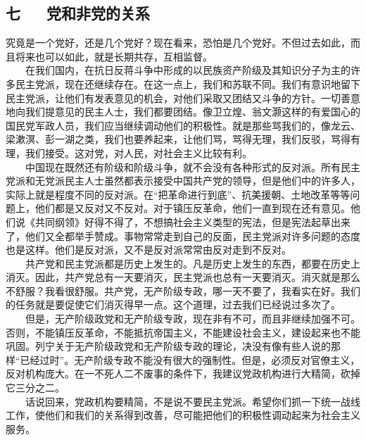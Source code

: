 \documentclass[cn,11pt,chinese]{elegantbook}
\def\myformat#1{\hfil\hfil #1}
\begin{document}
\subsection*{\myformat{七 　  党和非党的关系}}
究竟是一个党好，还是几个党好？现在看来，恐怕是几个党好。不但过去如此，而且将来也可以如此，就是长期共存，互相监督。\\
　　在我们国内，在抗日反蒋斗争中形成的以民族资产阶级及其知识分子为主的许多民主党派，现在还继续存在。在这一点上，我们和苏联不同。我们有意识地留下民主党派，让他们有发表意见的机会，对他们采取又团结又斗争的方针。一切善意地向我们提意见的民主人士，我们都要团结。像卫立煌、翁文灏这样的有爱国心的国民党军政人员，我们应当继续调动他们的积极性。就是那些骂我们的，像龙云、梁漱溟、彭一湖之类，我们也要养起来，让他们骂，骂得无理，我们反驳，骂得有理，我们接受。这对党，对人民，对社会主义比较有利。\\
　　中国现在既然还有阶级和阶级斗争，就不会没有各种形式的反对派。所有民主党派和无党派民主人士虽然都表示接受中国共产党的领导，但是他们中的许多人，实际上就是程度不同的反对派。在“把革命进行到底”、抗美援朝、土地改革等等问题上，他们都是又反对又不反对。对于镇压反革命，他们一直到现在还有意见。他们说《共同纲领》好得不得了，不想搞社会主义类型的宪法，但是宪法起草出来了，他们又全都举手赞成。事物常常走到自己的反面，民主党派对许多问题的态度也是这样。他们是反对派，又不是反对派常常由反对走到不反对。\\
　　共产党和民主党派都是历史上发生的。凡是历史上发生的东西，都要在历史上消灭。因此，共产党总有一天要消灭，民主党派也总有一天要消灭。消灭就是那么不舒服？我看很舒服。共产党，无产阶级专政，哪一天不要了，我看实在好。我们的任务就是要促使它们消灭得早一点。这个道理，过去我们已经说过多次了。\\
　　但是，无产阶级政党和无产阶级专政，现在非有不可，而且非继续加强不可。否则，不能镇压反革命，不能抵抗帝国主义，不能建设社会主义，建设起来也不能巩固。列宁关于无产阶级政党和无产阶级专政的理论，决没有像有些人说的那样“已经过时”。无产阶级专政不能没有很大的强制性。但是，必须反对官僚主义，反对机构庞大。在一不死人二不废事的条件下，我建议党政机构进行大精简，砍掉它三分之二。\\
　　话说回来，党政机构要精简，不是说不要民主党派。希望你们抓一下统一战线工作，使他们和我们的关系得到改善，尽可能把他们的积极性调动起来为社会主义服务。\\
\end{document}
